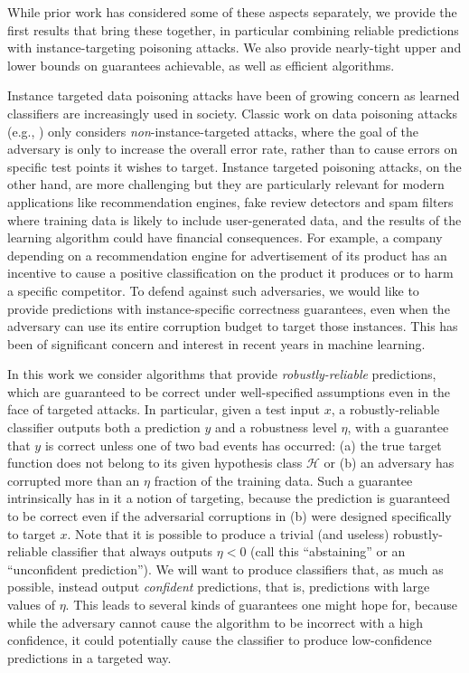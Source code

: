 \documentclass[11pt]{article}
\newcommand{\0}{\mathbf{0}}
\newcommand{\1}{\mathbf{1}}
\newcommand{\cH}{\mathcal{H}}
\begin{document}
While prior work has considered some of these aspects separately, we provide the first results that bring these together, in particular combining reliable predictions with instance-targeting poisoning attacks.
We also provide  nearly-tight upper and lower bounds on guarantees achievable, as well as efficient algorithms.


\smallskip

Instance targeted data poisoning attacks have been of growing concern as learned classifiers are increasingly used in society.
Classic work on data poisoning attacks
(e.g., \cite{valiant1985learning,kearns1993learning,bshouty2002pac,awasthi2017power})
only considers \emph{non}-instance-targeted attacks,
where the goal of the adversary is only to increase
the overall error rate, rather than to cause errors
on specific test points it wishes to target.
Instance targeted poisoning attacks, on the other hand, are more challenging but they are particularly
relevant for modern applications like recommendation engines, fake review detectors and spam filters where training data is likely to include user-generated data, and the results of the learning algorithm could have financial consequences. For example, a company depending on a recommendation engine for advertisement of its product has an incentive to cause a positive classification on the product it produces or to harm a specific competitor.
To defend against such adversaries, we would like to provide predictions with instance-specific correctness guarantees, even when the adversary can use its entire corruption budget to target those instances. 
This has been of significant concern and interest in recent years in machine learning.



In this work we consider algorithms that provide {\em robustly-reliable} predictions, which are guaranteed to be correct under well-specified assumptions even in the face of targeted attacks.  In particular, given a test input $x$, a robustly-reliable classifier outputs both a prediction $y$ and a robustness level $\eta$, with a guarantee that $y$ is correct unless one of two bad events has occurred: (a) the true target function does not belong to its given hypothesis class $\cH$ or (b) an adversary has corrupted more than an $\eta$ fraction of the training data.  Such a guarantee intrinsically has in it a notion of targeting, because the prediction is guaranteed to be correct even if the adversarial corruptions in (b) were designed specifically to target $x$.
Note that it is possible to produce a trivial (and useless) robustly-reliable classifier that always outputs $\eta < 0$ (call this  ``abstaining'' or an ``unconfident prediction'').   We will want to produce classifiers that, as much as possible, instead output {\em confident} predictions, that is, predictions with large values of $\eta$.
This leads to several kinds of guarantees one might hope for, because while the adversary cannot cause the algorithm to be incorrect  with a high confidence, it could potentially cause the classifier to produce low-confidence predictions in a targeted way.
\end{document}
